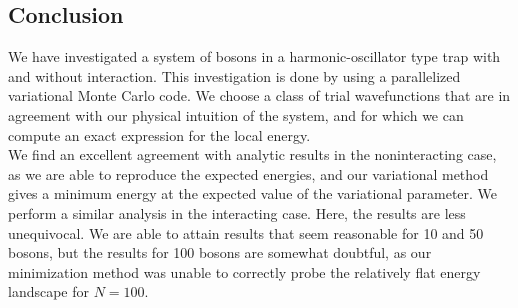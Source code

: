 \documentclass[a4paper, 10pt]{article}
\begin{document}
	\subsection{Conclusion}
	We have investigated a system of bosons in a harmonic-oscillator type trap with and without interaction. This investigation is done by using a parallelized variational Monte Carlo code. We choose a class of trial wavefunctions that are in agreement with our physical intuition of the system, and for which we can compute an exact expression for the local energy.\\
	\linebreak
	We find an excellent agreement with analytic results in the noninteracting case, as we are able to reproduce the expected energies, and our variational method gives a minimum energy at the expected value of the variational parameter. We perform a similar analysis in the interacting case. Here, the results are less unequivocal. We are able to attain results that seem reasonable for 10 and 50 bosons, but the results for 100 bosons are somewhat doubtful, as our minimization method was unable to correctly probe the relatively flat energy landscape for $N=100$.  
	
\end{document}
